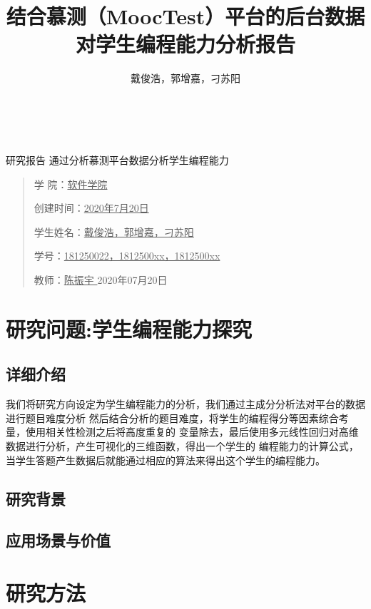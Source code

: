 \documentclass[UTF8]{ctexart}
\date{}
\title{结合慕测（MoocTest）平台的后台数据对学生编程能力分析报告}
\author{\small 戴俊浩，郭增嘉，刁苏阳}
\begin{document}
\ttfamily \songti
{}

\begin{center}
    \quad \\
    \quad \\
    \heiti \fontsize{45}{17} 研\quad 究\quad 报\quad 告
    \vskip 3.5cm
    \heiti {} 通过分析慕测平台数据分析学生编程能力	
\end{center}
\vskip 3.5cm

\begin{quotation}
    \songti \fontsize{15}{15}
    \doublespacing
    \par\setlength\parindent{12em}
    \quad 

    学\hspace{0.61cm} 院：\underline{\quad 软件学院\quad}

    创建时间：\underline{2020年7月20日}

    学生姓名：\underline{戴俊浩，郭增嘉，刁苏阳}

    学\hspace{0.61cm}号：\underline{\small 181250022，1812500xx，1812500xx}

    教\hspace{0.61cm}师：\underline{\qquad 陈振宇 \qquad}
    \vskip 2cm
    \centering
    2020年07月20日
\end{quotation}

\newpage
\tableofcontents
\newpage
\section{研究问题:学生编程能力探究}
\subsection{详细介绍}
我们将研究方向设定为学生编程能力的分析，我们通过主成分分析法对平台的数据进行题目难度分析
然后结合分析的题目难度，将学生的编程得分等因素综合考量，使用相关性检测之后将高度重复的
变量除去，最后使用多元线性回归对高维数据进行分析，产生可视化的三维函数，得出一个学生的
编程能力的计算公式，当学生答题产生数据后就能通过相应的算法来得出这个学生的编程能力。
\subsection{研究背景}
\subsection{应用场景与价值}
\section{研究方法}
\end{document}
